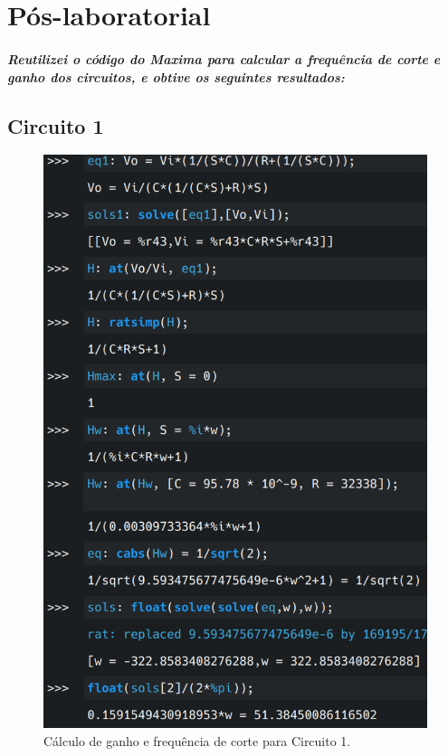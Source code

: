 \documentclass[12pt,twoside, a4paper, twocolumn]{article}
\begin{document}
\newpage


\section{Pós-laboratorial}


\subparagraph*{Reutilizei o código do Maxima para calcular a frequência de corte e ganho dos circuitos, e obtive os seguintes resultados:}




\subsection{Circuito 1}


\begin{figure}[h]
    \centering
    \includegraphics[width=1\columnwidth]{images/circuito1_freqreal.png}
    \caption{Cálculo de ganho e frequência de corte para Circuito 1.}
\end{figure}
\end{document}
